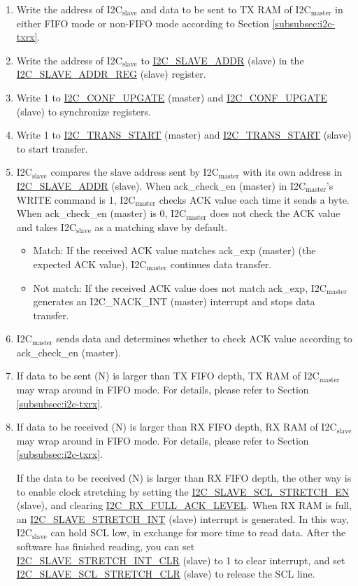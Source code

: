 \documentclass[main\_\_EN.tex]{subfiles}
\begin{document}
\begin{enumerate}
\item Write the address of I2C$_\text{slave}$ and data to be sent to TX RAM of I2C$_\text{master}$ in either FIFO mode or non-FIFO mode according to Section \ref{subsubsec:i2c-txrx}.
\item Write the address of I2C$_\text{slave}$ to \hyperref[fielddesc:I2CSLAVEADDR]{I2C\_SLAVE\_ADDR} (slave) in the \hyperref[regdesc:I2CSLAVEADDRREG]{I2C\_SLAVE\_ADDR\_REG} (slave) register.
\item Write 1 to \hyperref[fielddesc:I2CCONFUPGATE]{I2C\_CONF\_UPGATE} (master) and \hyperref[fielddesc:I2CCONFUPGATE]{I2C\_CONF\_UPGATE} (slave) to synchronize registers.
\item Write 1 to \hyperref[fielddesc:I2CTRANSSTART]{I2C\_TRANS\_START} (master) and \hyperref[fielddesc:I2CTRANSSTART]{I2C\_TRANS\_START} (slave) to start transfer.
\item I2C$_\text{slave}$ compares the slave address sent by I2C$_\text{master}$ with its own address in \hyperref[fielddesc:I2CSLAVEADDR]{I2C\_SLAVE\_ADDR} (slave). When ack\_check\_en (master) in I2C$_\text{master}$'s WRITE command is 1, I2C$_\text{master}$ checks ACK value each time it sends a byte. When ack\_check\_en (master) is 0, I2C$_\text{master}$ does not check the ACK value and takes I2C$_\text{slave}$ as a matching slave by default.
\begin{itemize}
\item Match: If the received ACK value matches ack\_exp (master) (the expected ACK value), I2C$_\text{master}$ continues data transfer.
\item Not match: If the received ACK value does not match ack\_exp, I2C$_\text{master}$ generates an I2C\_NACK\_INT (master) interrupt and stops data transfer.
\end{itemize}

\item I2C$_\text{master}$ sends data and determines whether to check ACK value according to ack\_check\_en (master).
\item If data to be sent (N) is larger than TX FIFO depth, TX RAM of I2C$_\text{master}$ may wrap around in FIFO mode. For details, please refer to Section \ref{subsubsec:i2c-txrx}. 
\item If data to be received (N) is larger than RX FIFO depth, RX RAM of I2C$_\text{slave}$ may wrap around in FIFO mode. For details, please refer to Section \ref{subsubsec:i2c-txrx}. 

If the data to be received (N) is larger than RX FIFO depth, the other way is to enable clock stretching by setting the \hyperref[fielddesc:I2CSLAVESCLSTRETCHEN]{I2C\_SLAVE\_SCL\_STRETCH\_EN} (slave), and clearing \hyperref[fielddesc:I2CRXFULLACKLEVEL]{I2C\_RX\_FULL\_ACK\_LEVEL}. When RX RAM is full, an \hyperref[int:i2c-slave-stretch]{I2C\_SLAVE\_STRETCH\_INT} (slave) interrupt is generated. In this way, I2C$_\text{slave}$ can hold SCL low, in exchange for more time to read data. After the software has finished reading, you can set \hyperref[fielddesc:I2CSLAVESTRETCHINTCLR]{I2C\_SLAVE\_STRETCH\_INT\_CLR} (slave) to 1 to clear interrupt, and set \hyperref[fielddesc:I2CSLAVESCLSTRETCHCLR]{I2C\_SLAVE\_SCL\_STRETCH\_CLR} (slave) to release the SCL line.


\end{enumerate}
\end{document}
